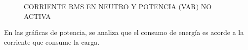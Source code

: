     \begin{figure}[H]
      \hfill
      \hfill
      \hfill
      \caption{CORRIENTE RMS EN NEUTRO Y POTENCIA (VAR) NO ACTIVA}
      \end{figure}

      En las gráficas de potencia, se analiza que el consumo de energía es acorde a la corriente que consume la carga.

  